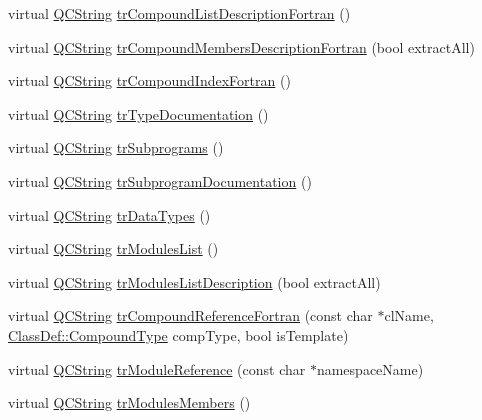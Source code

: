 \begin{DoxyCompactItemize}
\item 
virtual \hyperlink{class_q_c_string}{Q\-C\-String} \hyperlink{class_translator_polish_a10aa72b35051f95ba30f2b0312ce705c}{tr\-Compound\-List\-Description\-Fortran} ()
\item 
virtual \hyperlink{class_q_c_string}{Q\-C\-String} \hyperlink{class_translator_polish_a0c98da65b5772e9c2876855a42d44127}{tr\-Compound\-Members\-Description\-Fortran} (bool extract\-All)
\item 
virtual \hyperlink{class_q_c_string}{Q\-C\-String} \hyperlink{class_translator_polish_a933624b6cffb8fdc03e9fc4110640fc9}{tr\-Compound\-Index\-Fortran} ()
\item 
virtual \hyperlink{class_q_c_string}{Q\-C\-String} \hyperlink{class_translator_polish_ae031421205271f1a32fa3838a79b8902}{tr\-Type\-Documentation} ()
\item 
virtual \hyperlink{class_q_c_string}{Q\-C\-String} \hyperlink{class_translator_polish_a8d4e1de8fb5c2af1fd073c682556f999}{tr\-Subprograms} ()
\item 
virtual \hyperlink{class_q_c_string}{Q\-C\-String} \hyperlink{class_translator_polish_add6df0842eb6016d108814567d677055}{tr\-Subprogram\-Documentation} ()
\item 
virtual \hyperlink{class_q_c_string}{Q\-C\-String} \hyperlink{class_translator_polish_a77941890cf3f7cd1b67bec4cea91439b}{tr\-Data\-Types} ()
\item 
virtual \hyperlink{class_q_c_string}{Q\-C\-String} \hyperlink{class_translator_polish_a411e2c242c2707aed706b2b0572292db}{tr\-Modules\-List} ()
\item 
virtual \hyperlink{class_q_c_string}{Q\-C\-String} \hyperlink{class_translator_polish_a4f1ad06ac7478b9058d7f388a2b67566}{tr\-Modules\-List\-Description} (bool extract\-All)
\item 
virtual \hyperlink{class_q_c_string}{Q\-C\-String} \hyperlink{class_translator_polish_a79d39414275f1cacb484f78806a65869}{tr\-Compound\-Reference\-Fortran} (const char $\ast$cl\-Name, \hyperlink{class_class_def_a768a6f0a6fd7e9087ff7971abbcc3f36}{Class\-Def\-::\-Compound\-Type} comp\-Type, bool is\-Template)
\item 
virtual \hyperlink{class_q_c_string}{Q\-C\-String} \hyperlink{class_translator_polish_a5b0385db8ce8e7c8251e31867c6fa8d5}{tr\-Module\-Reference} (const char $\ast$namespace\-Name)
\item 
virtual \hyperlink{class_q_c_string}{Q\-C\-String} \hyperlink{class_translator_polish_a75279d9914e0cc54ee5f4b15ddaa234c}{tr\-Modules\-Members} ()

\end{DoxyCompactItemize}

